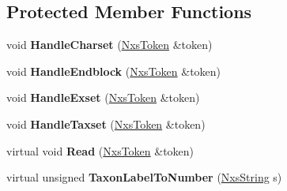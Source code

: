\subsection*{Protected Member Functions}
\begin{DoxyCompactItemize}
\item 
\hypertarget{classNxsAssumptionsBlock_ab08302b1e83993e290aa46ee9492598e}{
void {\bfseries HandleCharset} (\hyperlink{classNxsToken}{NxsToken} \&token)}
\label{classNxsAssumptionsBlock_ab08302b1e83993e290aa46ee9492598e}

\item 
\hypertarget{classNxsAssumptionsBlock_aa110a0927abf602901eea652d6837785}{
void {\bfseries HandleEndblock} (\hyperlink{classNxsToken}{NxsToken} \&token)}
\label{classNxsAssumptionsBlock_aa110a0927abf602901eea652d6837785}

\item 
\hypertarget{classNxsAssumptionsBlock_aa072891dbd4a6f44c5c6652a5e33ed33}{
void {\bfseries HandleExset} (\hyperlink{classNxsToken}{NxsToken} \&token)}
\label{classNxsAssumptionsBlock_aa072891dbd4a6f44c5c6652a5e33ed33}

\item 
\hypertarget{classNxsAssumptionsBlock_a055f3c4c8a07f9428b68fbd42d1714fc}{
void {\bfseries HandleTaxset} (\hyperlink{classNxsToken}{NxsToken} \&token)}
\label{classNxsAssumptionsBlock_a055f3c4c8a07f9428b68fbd42d1714fc}

\item 
\hypertarget{classNxsAssumptionsBlock_ab5564d8dc36afc344531b24c41b2689f}{
virtual void {\bfseries Read} (\hyperlink{classNxsToken}{NxsToken} \&token)}
\label{classNxsAssumptionsBlock_ab5564d8dc36afc344531b24c41b2689f}

\item 
\hypertarget{classNxsAssumptionsBlock_a33b56497b1dbfc694d5f3e4d84a76b11}{
virtual unsigned {\bfseries TaxonLabelToNumber} (\hyperlink{classNxsString}{NxsString} s)}
\label{classNxsAssumptionsBlock_a33b56497b1dbfc694d5f3e4d84a76b11}

\end{DoxyCompactItemize}
